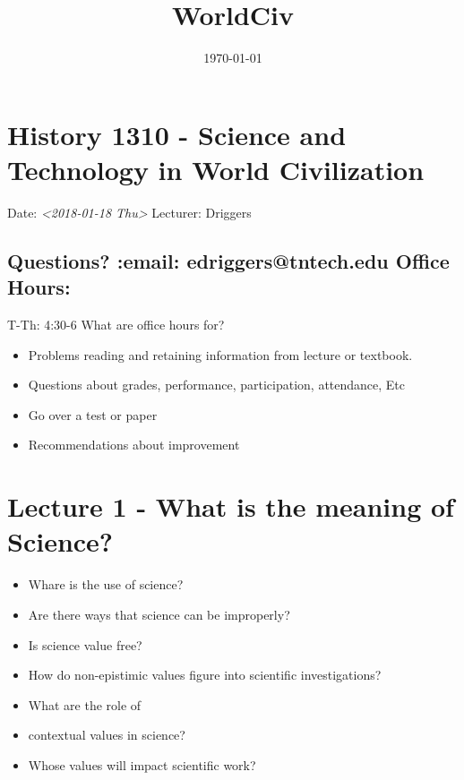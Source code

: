 \documentclass[11pt]{article}
\date{\today}
\title{WorldCiv}
\begin{document}
\maketitle
\tableofcontents



\section{History 1310 - Science and Technology in World Civilization}
\label{sec-1}

Date: \textit{<2018-01-18 Thu>} Lecturer: Driggers

\subsection{Questions? :email: edriggers@tntech.edu \textbf{Office Hours}:}
\label{sec-1-1}
T-Th: 4:30-6
What are office hours for? 
\begin{itemize}
\item Problems reading and retaining information from lecture or textbook.

\item Questions about grades, performance, participation, attendance, Etc

\item Go over a test or paper

\item Recommendations about improvement
\end{itemize}

\section{Lecture 1 - What is the meaning of Science?}
\label{sec-2}

\begin{itemize}
\item Whare is the use of science?

\item Are there ways that science can be improperly?

\item Is science value free?

\item How do non-epistimic values figure into scientific investigations?

\item What are the role of

\item contextual values in science?

\item Whose values will impact scientific work?
\end{itemize}
\end{document}
